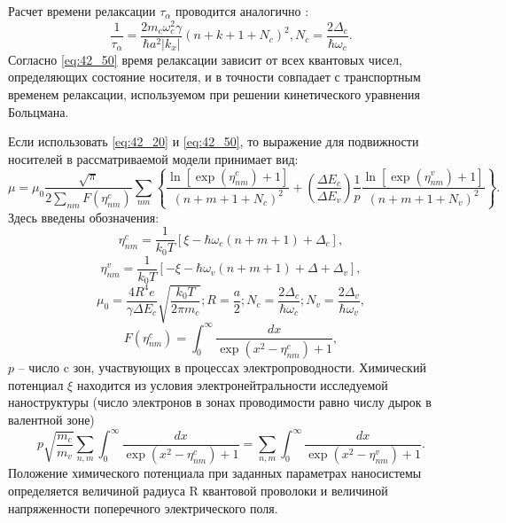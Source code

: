 Расчет времени релаксации $\tau _{\alpha } $ проводится аналогично \cite{Karapetyan2011}:
\begin{equation} \label{eq:42_50}
\frac{1}{\tau _{\alpha } } =\frac{2m_{c} \omega _{c}^{2} \gamma }{\hbar a^{2} \left|k_{x} \right|} \left(n+k+1+N_{c} \right)^{2} , N_{c} =\frac{2\Delta _{c} }{\hbar \omega _{c} } .
\end{equation} 
Согласно \eqref{eq:42_50} время релаксации зависит от всех квантовых чисел, определяющих состояние носителя, и в точности совпадает с транспортным временем релаксации, используемом при решении кинетического уравнения Больцмана.

Если использовать \eqref{eq:42_20} и \eqref{eq:42_50}, то выражение для подвижности носителей в рассматриваемой модели принимает вид:
\begin{equation} \label{eq:42_60}
\mu =\mu _{0} \frac{\sqrt{\pi } }{2\sum _{nm}F(\eta _{nm}^{c} ) } \sum _{nm}\left\{\frac{\ln \left[\exp \left(\eta _{nm}^{c} \right)+1\right]}{\left(n+m+1+N_{c} \right)^{2} } +\left(\frac{\Delta E_{c} }{\Delta E_{v} } \right)\frac{1}{p} \frac{\ln \left[\exp \left(\eta _{nm}^{v} \right)+1\right]}{\left(n+m+1+N_{v} \right)^{2} } \right\} . 
\end{equation} 
Здесь введены обозначения:
\[
\eta _{nm}^{c} =\frac{1}{k_{0} T} \left[\xi -\hbar \omega _{c} \left(n+m+1\right)+\Delta _{c} \right],\] 
\[\eta _{nm}^{v} =\frac{1}{k_{0} T} \left[-\xi -\hbar \omega _{v} \left(n+m+1\right)+\Delta +\Delta _{v} \right],
\] 
\[
\mu _{0} =\frac{4R^{4} e}{\gamma \Delta E_{c} } \sqrt{\frac{k_{0} T}{2\pi m_{c} } } ; R=\frac{a}{2} ; N_{c} =\frac{2\Delta _{c} }{\hbar \omega _{c} } ; N_{v} =\frac{2\Delta _{v} }{\hbar \omega _{v} } ,
\] 
\[
F(\eta _{nm}^{c} )=\int _{0}^{\infty }\frac{dx}{\exp \left(x^{2} -\eta _{nm}^{c} \right)+1}  ,
\] 
$p$ -- число c зон, участвующих в процессах электропроводности. Химический потенциал $\xi $ находится из условия электронейтральности исследуемой наноструктуры (число электронов в зонах проводимости равно числу дырок в валентной зоне)
\begin{equation} \label{eq:42_70}
p\sqrt{\frac{m_{c} }{m_{v} } } \sum _{n,m}\int _{0}^{\infty }\frac{dx}{\exp \left(x^{2} -\eta _{nm}^{c} \right)+1}   =\sum _{n,m}\int _{0}^{\infty }\frac{dx}{\exp \left(x^{2} -\eta _{nm}^{v} \right)+1}. 
\end{equation} 
Положение химического потенциала при заданных параметрах наносистемы определяется величиной радиуса R квантовой проволоки и величиной напряженности поперечного электрического поля.

